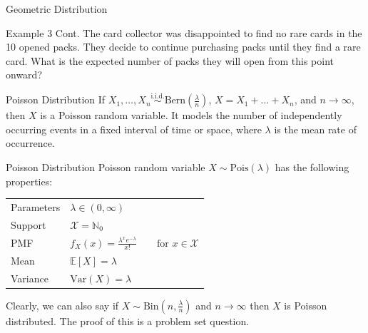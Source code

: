 \documentclass[10pt]{beamer}
\begin{document}
\begin{frame}[fragile]{Geometric Distribution}
\begin{exampleblock}{Example 3 Cont.}
The card collector was disappointed to find no rare cards in the 10 opened packs. They decide to continue purchasing packs until they find a rare card. What is the expected number of packs they will open from this point onward?
\end{exampleblock}
\end{frame}

\begin{frame}[fragile]{Poisson Distribution}
If \(X_1, \dots, X_n \overset{\textrm{i.i.d.}}{\sim} \textrm{Bern}\left(\frac{\lambda}{n}\right)\), \(X = X_1 + \dots + X_n\), and \(n \rightarrow \infty\), then \(X\) is a Poisson random variable. It models the number of independently occurring events in a fixed interval of time or space, where \(\lambda\) is the mean rate of occurrence.

\begin{alertblock}{Poisson Distribution}
Poisson random variable \(X \sim \mathrm{Pois}\left(\lambda\right)\) has the following properties:
  \begin{table}
    \begin{tabular}{ll}
      \toprule
      Parameters & \(\lambda \in \left(0, \infty\right)\)\\
      Support & \(\mathcal{X} = \mathbb{N}_0\)\\
      PMF & \(f_X\left(x\right) = \frac{\lambda^x e^{-\lambda}}{x!}\qquad\textrm{for }x \in \mathcal{X}\)\\
      Mean & \(\mathbb{E}\left[X\right] = \lambda\)\\
      Variance & \(\textrm{Var}\left(X\right) = \lambda\)\\
      \bottomrule
    \end{tabular}
  \end{table}
\end{alertblock}

Clearly, we can also say if \(X \sim \textrm{Bin}\left(n, \frac{\lambda}{n}\right)\) and \(n \rightarrow \infty\) then \(X\) is Poisson distributed. The proof of this is a problem set question.
\end{frame}
\end{document}
